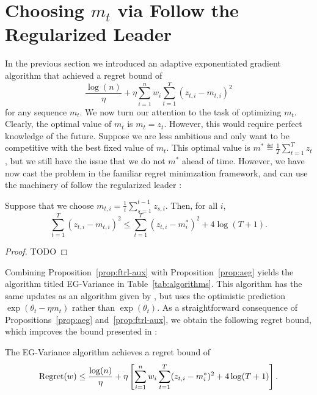 \documentclass[paper_icml.tex]{subfiles}
\begin{document}
\section{Choosing $m_t$ via Follow the Regularized Leader} 
\label{sec:ftrl-aux}
In the previous section we introduced an adaptive exponentiated 
gradient algorithm that achieved a regret bound of 
\[ \frac{\log(n)}{\eta} + \eta \sum_{i=1}^n w_i \sum_{t=1}^T (z_{t,i} - m_{t,i})^2 \]
for any sequence $m_t$. We now turn our attention to the task of 
optimizing $m_t$. Clearly, the optimal value of $m_t$ is $m_t = z_t$. However, 
this would require perfect knowledge of the future. Suppose we are less ambitious 
and only want to be competitive with the best fixed value of $m_t$. This optimal value 
is $m^* \eqdef \frac{1}{T} \sum_{t=1}^T z_t$, but we still have the issue that 
we do not $m^*$ ahead of time. However, we have now cast the problem in the familiar 
regret minimzation framework, and can use the machinery of follow the regularized 
leader \cite{hazan2011ftrl}:
\begin{proposition}
\label{prop:ftrl-aux}
Suppose that we choose $m_{t,i} = \frac{1}{t} \sum_{s=1}^{t-1} z_{s,i}$. 
Then, for all $i$, 
\[ \sum_{t=1}^T (z_{t,i} - m_{t,i})^2 \leq \sum_{t=1}^T (z_{t,i} - m^*_i)^2 + 4\log(T+1). \]
\end{proposition}
\begin{proof}
TODO
\end{proof}
Combining Proposition~\ref{prop:ftrl-aux} with Proposition~\ref{prop:aeg} yields 
the algorithm titled EG-Variance in Table~\ref{tab:algorithms}. This algorithm has the 
same updates as an algorithm given by \cite{hazan2010variation}, but uses the 
optimistic prediction $\exp(\theta_t - \eta m_t)$ rather than $\exp(\theta_t)$. 
As a straightforward consequence of Propositions~\ref{prop:aeg} and~\ref{prop:ftrl-aux}, we 
obtain the following regret bound, which improves the bound presented in 
\cite{hazan2010variation}:
\begin{corollary}
\label{cor:EG-variance}
The EG-Variance algorithm achieves a regret bound of
\[ \operatorname{Regret}(w) \leq \frac{\log(n)}{\eta} + \eta \left[ \sum_{i=1}^n w_i \sum_{t=1}^T (z_{t,i} - m_i^*)^2 + 4\log(T+1) \right]. \]
\end{corollary}
\end{document}
